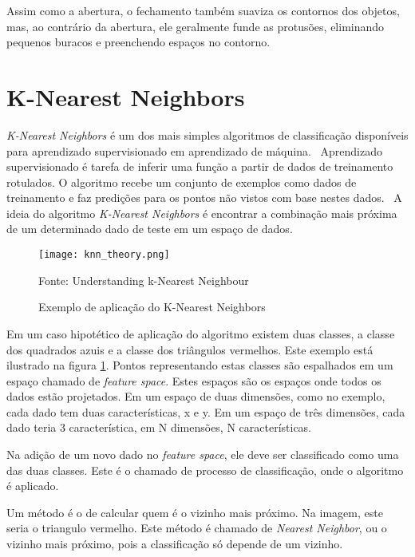 Assim como a abertura, o fechamento também suaviza os contornos dos objetos, mas, ao contrário da abertura, ele geralmente funde  as protusões, eliminando pequenos buracos e preenchendo espaços no contorno.\cite{gonzalez1977digital}

\section{K-Nearest Neighbors}
\label{sec:knearest}

\emph{K-Nearest Neighbors} é um dos mais simples algoritmos de classificação disponíveis para aprendizado supervisionado em aprendizado de máquina.~\cite{opencv2014knearest} Aprendizado supervisionado é tarefa de inferir uma função a partir de dados de treinamento rotulados. O algoritmo recebe um conjunto de exemplos como dados de treinamento e faz predições para os pontos não vistos com base nestes dados.~\cite{mohri2012foundations} A ideia do algoritmo \emph{K-Nearest Neighbors} é encontrar a combinação mais próxima de um determinado dado de teste em um espaço de dados.~\cite{opencv2014knearest}

\begin{figure}[H]
	\centering
	\texttt{[image: knn\_theory.png]}
	\caption{Exemplo de aplicação do K-Nearest Neighbors}
Fonte: Understanding k-Nearest Neighbour~\cite{opencv2014knearest}
	\label{fig:knearest_example}
\end{figure}

Em um caso hipotético de aplicação do algoritmo existem duas classes, a classe dos quadrados azuis e a classe dos triângulos vermelhos. Este exemplo está ilustrado na figura \ref{fig:knearest_example}. Pontos representando estas classes são espalhados em um espaço chamado de \emph{feature space}. Estes espaços são os espaços onde todos os dados estão projetados. Em um espaço de duas dimensões, como no exemplo, cada dado tem duas características, x e y. Em um espaço de três dimensões, cada dado teria 3 característica, em N dimensões, N características.

Na adição de um novo dado no \emph{feature space}, ele deve ser classificado como uma das duas classes. Este é o chamado de processo de classificação, onde o algoritmo é aplicado.

Um método é o de calcular quem é o vizinho mais próximo. Na imagem, este seria o triangulo vermelho. Este método é chamado de \emph{Nearest Neighbor}, ou o vizinho mais próximo, pois a classificação só depende de um vizinho.

